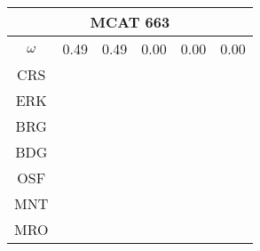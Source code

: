 \documentclass[a4paper,12pt]{article}
\begin{document}
\begin{tabular}{|c|c|c|c|c|c|}%
         \hline \multicolumn{6}{|c|}{MCAT 663} \\ \hline
         $\omega$&0.49&0.49&0.00&0.00&0.00\\ \hline %
        CRS&\cellcolor[HTML]{E41A1C}&\cellcolor[HTML]{E41A1C}&\cellcolor[HTML]{E41A1C}&\cellcolor[HTML]{E41A1C}&\cellcolor[HTML]{E41A1C}\\ \hline %
        ERK&\cellcolor[HTML]{E41A1C}&\cellcolor[HTML]{377EB8}&\cellcolor[HTML]{E41A1C}&\cellcolor[HTML]{E41A1C}&\cellcolor[HTML]{E41A1C}\\ \hline %
        BRG&\cellcolor[HTML]{377EB8}&\cellcolor[HTML]{377EB8}&\cellcolor[HTML]{E41A1C}&\cellcolor[HTML]{377EB8}&\cellcolor[HTML]{377EB8}\\ \hline %
        BDG&\cellcolor[HTML]{4DAF4A}&\cellcolor[HTML]{4DAF4A}&\cellcolor[HTML]{377EB8}&\cellcolor[HTML]{377EB8}&\cellcolor[HTML]{4DAF4A}\\ \hline %
        OSF&\cellcolor[HTML]{984EA3}&\cellcolor[HTML]{984EA3}&\cellcolor[HTML]{377EB8}&\cellcolor[HTML]{377EB8}&\cellcolor[HTML]{984EA3}\\ \hline %
        MNT&\cellcolor[HTML]{984EA3}&\cellcolor[HTML]{984EA3}&\cellcolor[HTML]{4DAF4A}&\cellcolor[HTML]{4DAF4A}&\cellcolor[HTML]{984EA3}\\ \hline %
        MRO&\cellcolor[HTML]{FF7F00}&\cellcolor[HTML]{FF7F00}&\cellcolor[HTML]{4DAF4A}&\cellcolor[HTML]{4DAF4A}&\cellcolor[HTML]{984EA3}\\ \hline %

\end{tabular}
\end{document}
